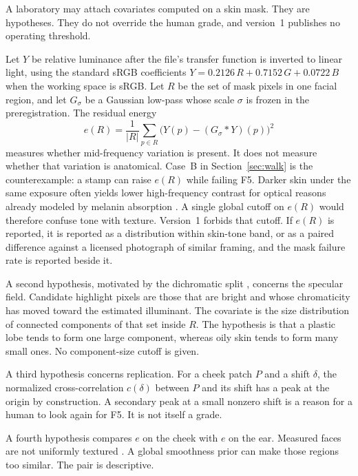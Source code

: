 \documentclass[10pt,twocolumn]{article}
\begin{document}
A laboratory may attach covariates computed on a skin mask. They are hypotheses. They do not override the human grade, and version~1 publishes no operating threshold.

Let \(Y\) be relative luminance after the file's transfer function is inverted to linear light, using the standard sRGB coefficients \(Y = 0.2126\,R + 0.7152\,G + 0.0722\,B\) when the working space is sRGB. Let \(R\) be the set of mask pixels in one facial region, and let \(G_{\sigma}\) be a Gaussian low-pass whose scale \(\sigma\) is frozen in the preregistration. The residual energy
\begin{equation}
  e(R) = \frac{1}{|R|}\sum_{p \in R}\bigl(Y(p) - (G_{\sigma} * Y)(p)\bigr)^{2}
  \label{eq:energy}
\end{equation}
measures whether mid-frequency variation is present. It does not measure whether that variation is anatomical. Case~B in Section~\ref{sec:walk} is the counterexample: a stamp can raise \(e(R)\) while failing F5. Darker skin under the same exposure often yields lower high-frequency contrast for optical reasons already modeled by melanin absorption \cite{igarashi2007,donner2008}. A single global cutoff on \(e(R)\) would therefore confuse tone with texture. Version~1 forbids that cutoff. If \(e(R)\) is reported, it is reported as a distribution within skin-tone band, or as a paired difference against a licensed photograph of similar framing, and the mask failure rate is reported beside it.

A second hypothesis, motivated by the dichromatic split \cite{shafer1985}, concerns the specular field. Candidate highlight pixels are those that are bright and whose chromaticity has moved toward the estimated illuminant. The covariate is the size distribution of connected components of that set inside \(R\). The hypothesis is that a plastic lobe tends to form one large component, whereas oily skin tends to form many small ones. No component-size cutoff is given.

A third hypothesis concerns replication. For a cheek patch \(P\) and a shift \(\delta\), the normalized cross-correlation \(c(\delta)\) between \(P\) and its shift has a peak at the origin by construction. A secondary peak at a small nonzero shift is a reason for a human to look again for F5. It is not itself a grade.

A fourth hypothesis compares \(e\) on the cheek with \(e\) on the ear. Measured faces are not uniformly textured \cite{weyrich2006}. A global smoothness prior can make those regions too similar. The pair is descriptive.
\end{document}
